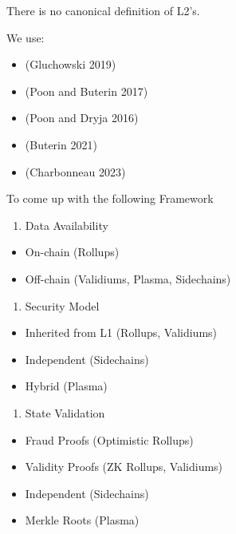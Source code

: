 \documentclass[
  letterpaper,
  DIV=11,
  numbers=noendperiod]{scrreprt}
\providecommand{\tightlist}{%
  \setlength{\itemsep}{0pt}\setlength{\parskip}{0pt}}\usepackage{longtable,booktabs,array}
\begin{document}
There is no canonical definition of L2's.

We use:

\begin{itemize}
\tightlist
\item
  (Gluchowski 2019)
\item
  (Poon and Buterin 2017)
\item
  (Poon and Dryja 2016)
\item
  (Buterin 2021)
\item
  (Charbonneau 2023)
\end{itemize}

To come up with the following Framework

\begin{enumerate}
\def\labelenumi{\arabic{enumi}.}
\tightlist
\item
  Data Availability
\end{enumerate}

\begin{itemize}
\tightlist
\item
  On-chain (Rollups)
\item
  Off-chain (Validiums, Plasma, Sidechains)
\end{itemize}

\begin{enumerate}
\def\labelenumi{\arabic{enumi}.}
\setcounter{enumi}{1}
\tightlist
\item
  Security Model
\end{enumerate}

\begin{itemize}
\tightlist
\item
  Inherited from L1 (Rollups, Validiums)
\item
  Independent (Sidechains)
\item
  Hybrid (Plasma)
\end{itemize}

\begin{enumerate}
\def\labelenumi{\arabic{enumi}.}
\setcounter{enumi}{2}
\tightlist
\item
  State Validation
\end{enumerate}

\begin{itemize}
\tightlist
\item
  Fraud Proofs (Optimistic Rollups)
\item
  Validity Proofs (ZK Rollups, Validiums)
\item
  Independent (Sidechains)
\item
  Merkle Roots (Plasma)
\end{itemize}
\end{document}
